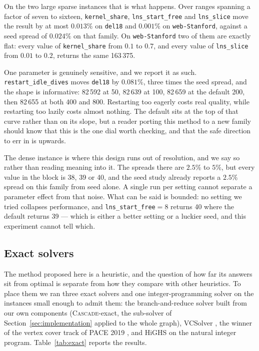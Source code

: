 \documentclass[preprint,12pt]{elsarticle}
\theoremstyle{definition}
\begin{document}
On the two large sparse instances that is what happens. Over ranges spanning a
factor of seven to sixteen, \texttt{kernel\_share}, \texttt{lns\_start\_free}
and \texttt{lns\_slice} move the result by at most $0.013\%$ on \texttt{del18}
and $0.001\%$ on \texttt{web-Stanford}, against a seed spread of $0.024\%$ on
that family. On \texttt{web-Stanford} two of them are exactly flat: every value of
\texttt{kernel\_share} from $0.1$ to $0.7$, and every value of
\texttt{lns\_slice} from $0.01$ to $0.2$, returns the same 163\,375.

One parameter is genuinely sensitive, and we report it as such.
\texttt{restart\_idle\_dives} moves \texttt{del18} by $0.081\%$, three times the
seed spread, and the shape is informative: 82\,592 at 50, 82\,639 at 100, 82\,659
at the default 200, then 82\,655 at both 400 and 800. Restarting too eagerly
costs real quality, while restarting too lazily costs almost nothing. The
default sits at the top of that curve rather than on its slope, but a reader
porting this method to a new family should know that this is the one dial worth
checking, and that the safe direction to err in is upwards.

The dense instance is where this design runs out of resolution, and we say so
rather than reading meaning into it. The spreads there are $2.5\%$ to $5\%$, but
every value in the block is 38, 39 or 40, and the seed study already reports a
$2.5\%$ spread on this family from seed alone. A single run per setting cannot
separate a parameter effect from that noise. What can be said is bounded: no
setting we tried collapses performance, and \texttt{lns\_start\_free}$=8$ returns
40 where the default returns 39 --- which is either a better setting or a luckier
seed, and this experiment cannot tell which.



\subsection{Exact solvers}
\label{sec:exact}

The method proposed here is a heuristic, and the question of how far its answers
sit from optimal is separate from how they compare with other heuristics. To
place them we ran three exact solvers and one integer-programming solver on the
instances small enough to admit them: the branch-and-reduce solver built from
our own components (\textsc{Cascade}-exact, the sub-solver of
Section~\ref{sec:implementation} applied to the whole graph), VCSolver
\cite{akiba2016}, the winner of the vertex cover track of PACE 2019
\cite{pace2019,hespe2020}, and HiGHS on the natural
integer program. Table~\ref{tab:exact} reports the results.
\end{document}
